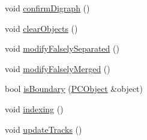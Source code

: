 \begin{DoxyCompactItemize}
\item 
void \hyperlink{class_p_c_tracking_a4f904fd5f0dd7b76370c2db9eed9e647}{confirm\-Digraph} ()
\item 
void \hyperlink{class_p_c_tracking_ad736fc5494cbeaf8aa86f470d79bd4b4}{clear\-Objects} ()
\item 
void \hyperlink{class_p_c_tracking_a6e69225b7cfc25dfdda463eceaca2bb4}{modify\-Falsely\-Separated} ()
\item 
void \hyperlink{class_p_c_tracking_aaf2bfca37caff62940979e05cd812103}{modify\-Falsely\-Merged} ()
\item 
bool \hyperlink{class_p_c_tracking_ae193eee9a7218ab301736ef42040be83}{is\-Boundary} (\hyperlink{class_p_c_object}{\-P\-C\-Object} \&object)
\item 
void \hyperlink{class_p_c_tracking_a9d92ce261d40c47e1d49b2ab9c0f5266}{indexing} ()
\item 
void \hyperlink{class_p_c_tracking_a85fd8bf718c7919cc302d4d3442f334b}{update\-Tracks} ()
\end{DoxyCompactItemize}
